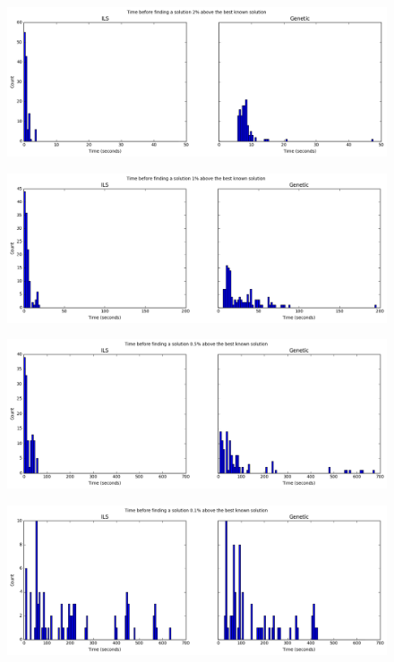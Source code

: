 \documentclass[a4paper]{article}
\begin{document}
        \begin{figure}[H]
            \centering
            \includegraphics[width=\textwidth]{t2.png}
        \end{figure}
                \begin{figure}[H]
            \centering
            \includegraphics[width=\textwidth]{t1.png}
        \end{figure}
                \begin{figure}[H]
            \centering
            \includegraphics[width=\textwidth]{t05.png}
        \end{figure}
                \begin{figure}[H]
            \centering
            \includegraphics[width=\textwidth]{t01.png}
        \end{figure}
\end{document}
